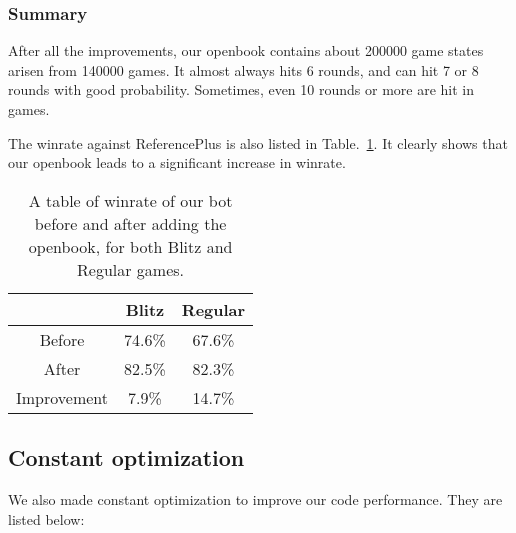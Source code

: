 \documentclass[10pt,twosidep]{article}
\begin{document}
\subsubsection{Summary}
After all the improvements, our openbook contains about 200000 game states arisen from 140000 games. It almost always hits 6 rounds, and can hit 7 or 8 rounds with good probability. Sometimes, even 10 rounds or more are hit in games. 

The winrate against ReferencePlus is also listed in Table.~\ref{tbl:openbook_final}. It clearly shows that our openbook leads to a significant increase in winrate. 

\begin{table}[h]
\centering
\begin{tabular}{|c|c|c|}
\hline
    & Blitz & Regular \\
\hline
Before  & 74.6\%    & 67.6\%\\
\hline
After   & 82.5\%    & 82.3\%\\
\hline
Improvement   & 7.9\%    & 14.7\%\\
\hline
\end{tabular}
\caption{A table of winrate of our bot before and after adding the openbook, for both Blitz and Regular games. }
\label{tbl:openbook_final}
\end{table}


\subsection{Constant optimization}
We also made constant optimization to improve our code performance. They are listed below: 
\end{document}
